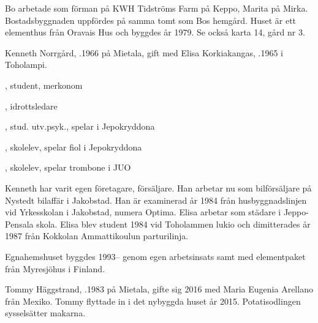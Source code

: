 Bo arbetade som förman på KWH Tidströms Farm på Keppo, Marita på Mirka. Bostadsbyggnaden uppfördes på samma tomt som Bos hemgård. Huset är ett elementhus från Oravais Hus och byggdes år 1979. Se också karta 14, gård nr 3.



%



%
Kenneth Norrgård, .1966 på Mietala, gift med Elisa Korkiakangas, .1965 i Toholampi.
\begin{jhchildren}
  \item {}, student, merkonom
  \item {}, idrottsledare
  \item {}, stud. utv.psyk., spelar i Jepokryddona
  \item {}, skolelev, spelar fiol i Jepokryddona
  \item {}, skolelev, spelar trombone i JUO
\end{jhchildren}

Kenneth har varit egen företagare, försäljare. Han arbetar nu som bilförsäljare på Nystedt bilaffär i Jakobstad. Han är examinerad år 1984 från husbyggnadslinjen vid Yrkesskolan i Jakobstad, numera Optima. Elisa arbetar som städare i Jeppo-Pensala skola. Elisa blev student 1984 vid Toholammen lukio och dimitterades år 1987 från Kokkolan Ammattikoulun parturilinja.

Egnahemshuset byggdes 1993-- genom egen arbetsinsats samt med elementpaket från Myresjöhus i Finland.



%



%
Tommy Häggstrand,  .1983 på Mietala, gifte sig 2016 med Maria Eugenia Arellano från Mexiko. Tommy flyttade in i det nybyggda huset år 2015. Potatisodlingen sysselsätter makarna.

